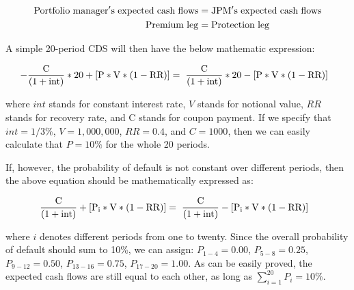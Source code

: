 \documentclass[article]{jss}
\begin{document}
\begin{align}
  \rm Portfolio\hspace{3pt}manager's\hspace{3pt}expected\hspace{3pt}cash\hspace{3pt}flows &= \rm JPM's\hspace{3pt}expected\hspace{3pt}cash\hspace{3pt}flows \\
  \rm Premium\hspace{3pt}leg &= \rm Protection\hspace{3pt}leg
\end{align}

A simple 20-period CDS will then have the below mathematic expression:

\begin{align}
  \rm \hspace{3pt}- \frac{C}{(1 + int)} * 20 + [ P * V * (1 - RR) ]  &= \rm \hspace{3pt}\frac{C}{(1 + int)} * 20 - [ P * V * (1 - RR) ] 
\end{align}

where $int$ stands for constant interest rate, $V$ stands for notional value, $RR$ stands for recovery rate, and C stands for coupon payment. If we specify that $int = 1/3\%$, $V = 1,000,000$, $RR = 0.4$, and $C = 1000$, then we can easily calculate that $P = 10\% $ for the whole 20 periods.

If, however, the probability of default is not constant over different periods, then the above equation should be mathematically expressed as:

\begin{align}
  \rm \hspace{3pt}\frac{C}{(1 + int)} + [ P_i * V * (1 - RR) ]  &= \rm \hspace{3pt} \frac{C}{(1 + int)} - [ P_i * V * (1 - RR) ] 
\end{align}

where $i$ denotes different periods from one to twenty. Since the overall probability of default should sum to 10\%, we can assign: $P_{1-4} = 0.00$, $P_{5-8} = 0.25$, $P_{9-12} = 0.50$, $P_{13-16} = 0.75$, $P_{17-20} = 1.00$. As can be easily proved, the expected cash flows are still equal to each other, as long as $\sum\limits_{i=1}^{20} P_i = 10\%$.


\end{document}
